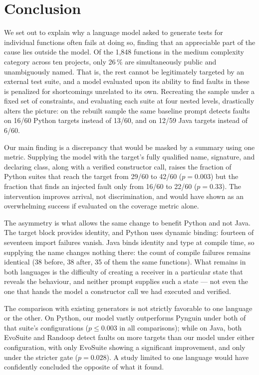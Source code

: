 \section{Conclusion}\label{sec:conclusion}

We set out to explain why a language model asked to generate tests for individual functions
often fails at doing so, finding that an appreciable part of the cause lies outside the model.
Of the 1{,}848 functions in the medium complexity category across ten projects, only 26\,\% are
simultaneously public and unambiguously named. That is, the rest cannot be legitimately targeted
by an external test suite, and a model evaluated upon its ability to find faults in these is
penalized for shortcomings unrelated to its own. Recreating the sample under a fixed set of
constraints, and evaluating each suite at four nested levels, drastically alters the picture:
on the rebuilt sample the same baseline prompt detects faults on 16/60 Python targets instead
of 13/60, and on 12/59 Java targets instead of 6/60.

Our main finding is a discrepancy that would be masked by a summary using one metric. Supplying
the model with the target's fully qualified name, signature, and declaring class, along with a
verified constructor call, raises the fraction of Python suites that reach the target from 29/60
to 42/60 ($p = 0.003$) but the fraction that finds an injected fault only from 16/60 to 22/60
($p = 0.33$). The intervention improves arrival, not discrimination, and would have shown as an
overwhelming success if evaluated on the coverage metric alone.

The asymmetry is what allows the same change to benefit Python and not Java. The target block
provides identity, and Python uses dynamic binding: fourteen of seventeen import failures vanish.
Java binds identity and type at compile time, so supplying the name changes nothing there: the
count of compile failures remains identical (38 before, 38 after, 35 of them the same
functions). What remains in both languages is the difficulty of creating a receiver in a
particular state that reveals the behaviour, and neither prompt supplies such a state --- not
even the one that hands the model a constructor call we had executed and verified.

The comparison with existing generators is not strictly favorable to one language or the other.
On Python, our model vastly outperforms Pynguin under both of that suite's configurations
($p \le 0.003$ in all comparisons); while on Java, both EvoSuite and Randoop detect faults on
more targets than our model under either configuration, with only EvoSuite showing a significant
improvement, and only under the stricter gate ($p = 0.028$). A study limited to one language
would have confidently concluded the opposite of what it found.

